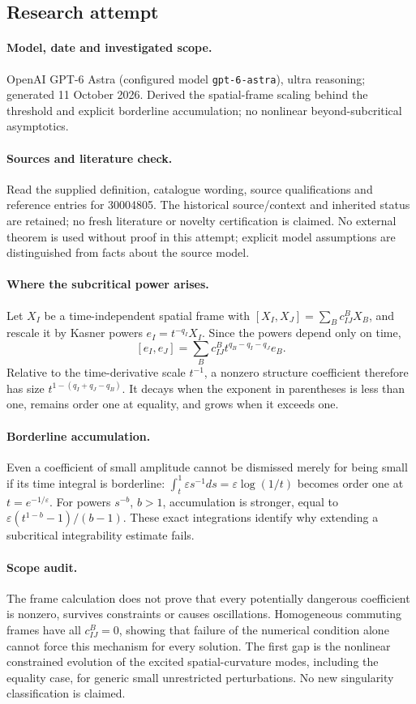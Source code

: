\documentclass[11pt]{article}
\begin{document}
\subsection{Research attempt}
\paragraph{Model, date and investigated scope.}
OpenAI GPT-6 Astra (configured model \texttt{gpt-6-astra}), ultra reasoning; generated 11 October 2026. Derived the spatial-frame scaling behind the threshold and explicit borderline accumulation; no nonlinear beyond-subcritical asymptotics.

\paragraph{Sources and literature check.}
Read the supplied definition, catalogue wording, source qualifications and reference entries for 30004805. The historical source/context and inherited status are retained; no fresh literature or novelty certification is claimed. No external theorem is used without proof in this attempt; explicit model assumptions are distinguished from facts about the source model.

\paragraph{Where the subcritical power arises.} Let \(X_I\) be a time-independent spatial frame with \([X_I,X_J]=\sum_B c_{IJ}^B X_B\), and rescale it by Kasner powers \(e_I=t^{-q_I}X_I\). Since the powers depend only on time,
\[
 [e_I,e_J]=\sum_B c_{IJ}^B t^{q_B-q_I-q_J}e_B.
\]
Relative to the time-derivative scale \(t^{-1}\), a nonzero structure coefficient therefore has size \(t^{1-(q_I+q_J-q_B)}\). It decays when the exponent in parentheses is less than one, remains order one at equality, and grows when it exceeds one.
\paragraph{Borderline accumulation.} Even a coefficient of small amplitude cannot be dismissed merely for being small if its time integral is borderline: \(\int_t^1\varepsilon s^{-1}ds=\varepsilon\log(1/t)\) becomes order one at \(t=e^{-1/\varepsilon}\). For powers \(s^{-b}\), \(b>1\), accumulation is stronger, equal to \(\varepsilon(t^{1-b}-1)/(b-1)\). These exact integrations identify why extending a subcritical integrability estimate fails.
\paragraph{Scope audit.} The frame calculation does not prove that every potentially dangerous coefficient is nonzero, survives constraints or causes oscillations. Homogeneous commuting frames have all \(c_{IJ}^B=0\), showing that failure of the numerical condition alone cannot force this mechanism for every solution. The first gap is the nonlinear constrained evolution of the excited spatial-curvature modes, including the equality case, for generic small unrestricted perturbations. No new singularity classification is claimed.
\end{document}
